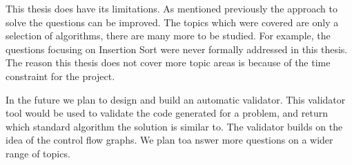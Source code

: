 \documentclass[10pt,twocolumn,hidelinks]{IEEEtran}
\begin{document}
 \par This thesis does have its limitations. As mentioned previously the approach to solve the questions can be improved. The topics which were covered are only a selection of algorithms, there are many more to be studied. For example, the questions focusing on Insertion Sort were never formally addressed in this thesis. The reason this thesis does not cover more topic areas is because of the time constraint for the project.
 \par In the future we plan to design and build an automatic validator. This validator tool would be used to validate the code generated for a problem, and return which standard algorithm the solution is similar to. The validator builds on the idea of the control flow graphs.
 We plan toa nswer more questions on a wider range of topics.



\end{document}
